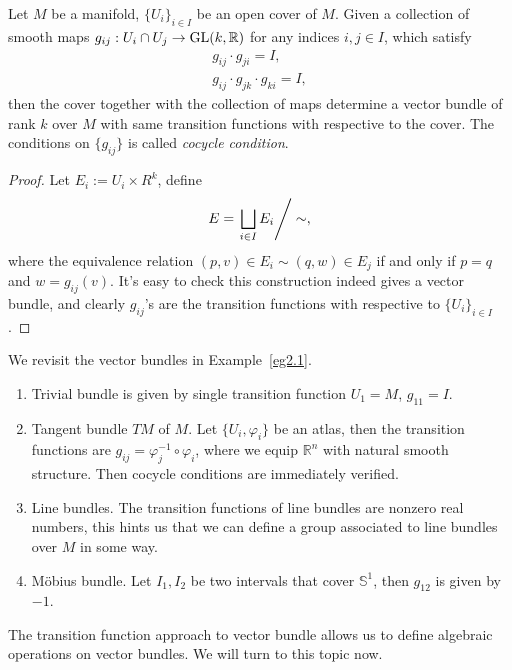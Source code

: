 \begin{prop}\label{transition function}
    Let $M$ be a manifold, $\{U_i\}_{i\in I}$ be an open cover of $M$.
    Given a collection of smooth maps $g_{ij}:U_i\cap U_j\to\mathrm{GL}(k,\mathbb{R})$ for any indices $i,j\in I$, which satisfy
    \begin{gather*}
        g_{ij}\cdot g_{ji}=I,\\
        g_{ij}\cdot g_{jk}\cdot g_{ki}=I,
    \end{gather*}
    then the cover together with the collection of maps determine a vector bundle of rank $k$ over $M$ with same transition functions with respective to the cover.
    The conditions on $\{g_{ij}\}$ is called \emph{cocycle condition}.
\end{prop}
\begin{proof}
    Let $E_i:=U_i\times R^k$, define
    \[E=\left.\bigsqcup_{i\in I}E_i\right/\sim,\]
    where the equivalence relation $(p,v)\in E_i\sim(q,w)\in E_j$ if and only if $p=q$ and $w=g_{ij}(v)$.
    It's easy to check this construction indeed gives a vector bundle, and clearly $g_{ij}$'s are the transition functions with respective to $\{U_i\}_{i\in I}$.
\end{proof}

\begin{eg}
    We revisit the vector bundles in Example~\ref{eg2.1}.
    \begin{enumerate}[(1)]
        \item Trivial bundle is given by single transition function $U_1=M$, $g_{11}=I$.
        \item Tangent bundle $TM$ of $M$.
        Let $\{U_i,\varphi_i\}$ be an atlas, then the transition functions are $g_{ij}=\varphi_j^{-1}\circ\varphi_i$, where we equip $\mathbb{R}^n$ with natural smooth structure.
        Then cocycle conditions are immediately verified.
        \item Line bundles.
        The transition functions of line bundles are nonzero real numbers, this hints us that we can define a group associated to line bundles over $M$ in some way.
        \item M\"obius bundle.
        Let $I_1,I_2$ be two intervals that cover $\mathbb{S}^1$, then $g_{12}$ is given by $-1$.
    \end{enumerate}
\end{eg}

The transition function approach to vector bundle allows us to define algebraic operations on vector bundles.
We will turn to this topic now.

